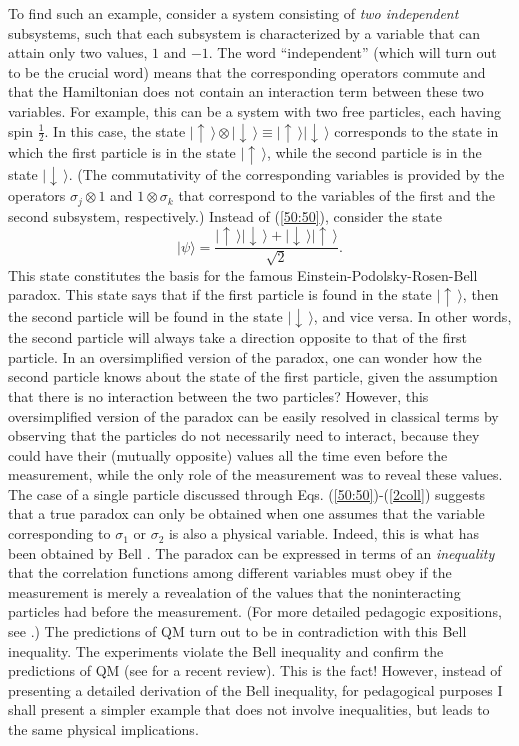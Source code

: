 \documentclass[12pt]{article}
\begin{document}
To find such an example, consider a system consisting of 
{\em two independent} subsystems, such that each subsystem
is characterized by a variable that can attain 
only two values, $1$ and $-1$. The word ``independent'' 
(which will turn out to be the crucial word) means that the corresponding
operators commute and that the Hamiltonian does not contain 
an interaction term between these two variables. 
For example, this can be a system with two free particles, 
each having spin $\frac{1}{2}$. In this case, the state 
$|\!\uparrow\,\rangle \otimes |\!\downarrow\,\rangle
\equiv |\!\uparrow\,\rangle |\!\downarrow\,\rangle$
corresponds to the state in which the first particle is in the 
state $|\!\uparrow\,\rangle$, while the second particle 
is in the state $|\!\downarrow\,\rangle$. 
(The commutativity of the corresponding variables is 
provided by the operators $\sigma_j\otimes 1$ and 
$1\otimes\sigma_k$ that correspond to the variables of the 
first and the second subsystem, respectively.)   
Instead of (\ref{50:50}), consider the state 
\begin{equation}\label{EPR}
|\psi\rangle = \frac{
|\!\uparrow\,\rangle |\!\downarrow\,\rangle + 
|\!\downarrow\,\rangle |\!\uparrow\,\rangle }{\sqrt{2}} .
\end{equation}
This state constitutes the basis for the famous   
Einstein-Podolsky-Rosen-Bell paradox. This state says that 
if the first particle is found in the state $|\!\uparrow\,\rangle$,
then the second particle will be found in the state
$|\!\downarrow\,\rangle$, and vice versa. In other words,   
the second particle will always take a direction opposite
to that of the first particle. In an oversimplified version of 
the paradox, one can wonder how the second particle 
knows about the state of the first particle, given the 
assumption that there is no interaction between the two 
particles? However, this oversimplified version of the 
paradox can be easily resolved in classical terms by observing 
that the particles do not necessarily need to interact, because
they could have their (mutually opposite) values all the time 
even before the measurement, while the only role of the measurement 
was to reveal these values. The case of a single particle 
discussed through Eqs. (\ref{50:50})-(\ref{2coll}) suggests 
that a true paradox can only be obtained when one assumes 
that the variable corresponding to $\sigma_1$ or $\sigma_2$ 
is also a physical variable. Indeed, this is what has been obtained 
by Bell \cite{bell}. The paradox can be expressed in terms of 
an {\em inequality} that the correlation functions among different 
variables must obey if the measurement is merely a revealation 
of the values that the noninteracting particles had before 
the measurement. (For more detailed pedagogic expositions, 
see \cite{merm1,laloe}.)       
The predictions of QM turn out to be in contradiction with this 
Bell inequality. The experiments violate the Bell inequality
and confirm the predictions of QM (see \cite{genov} for a recent review).
This is the fact! However, 
instead of presenting a detailed derivation 
of the Bell inequality, for pedagogical purposes 
I shall present a simpler example 
that does not involve inequalities, but leads to the same
physical implications.
\end{document}
